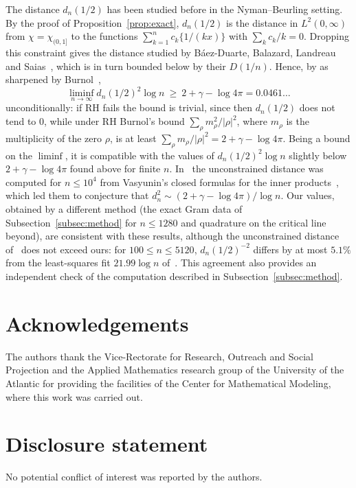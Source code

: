 \documentclass[11pt]{extarticle}
\numberwithin{equation}{section}
\theoremstyle{plain}
\theoremstyle{remark}
\begin{document}
The distance $d_n(1/2)$ has been studied before in the Nyman--Beurling setting. By
the proof of Proposition~\ref{prop:exact}, $d_n(1/2)$ is the distance in
$L^2(0,\infty)$ from $\chi = \chi_{(0,1]}$ to the functions
$\sum_{k=1}^{n} c_k \{1/(kx)\}$ with $\sum_{k} c_k/k = 0$. Dropping this constraint
gives the distance studied by B\'aez-Duarte, Balazard, Landreau and
Saias~\cite{BBLS}, which is in turn bounded below by their $D(1/n)$. Hence, by
\cite[Th\'eor\`eme]{BBLS} as sharpened by Burnol~\cite[Theorem~1.3]{burnol},
\[
\liminf_{n \to \infty} d_n(1/2)^2 \log n \ \geq\ 2 + \gamma - \log 4\pi = 0.0461\ldots
\]
unconditionally: if RH fails the bound is trivial, since then $d_n(1/2)$ does not tend
to $0$, while under RH Burnol's bound $\sum_\rho m_\rho^2/|\rho|^2$, where $m_\rho$ is
the multiplicity of the zero $\rho$, is at least
$\sum_\rho m_\rho/|\rho|^2 = 2 + \gamma - \log 4\pi$. Being a bound on the $\liminf$,
it is compatible with the values of $d_n(1/2)^2 \log n$ slightly below
$2 + \gamma - \log 4\pi$ found above for finite $n$. In~\cite[\S8]{BBLS} the unconstrained distance was computed for
$n \leq 10^4$ from Vasyunin's closed formulas for the inner
products~\cite{vasyunin}, which led them to conjecture
\cite[Conjecture~2]{BBLS} that $d_n^2 \sim (2 + \gamma - \log 4\pi)/\log n$. Our values,
obtained by a different method (the exact Gram data of Subsection~\ref{subsec:method}
for $n \leq 1280$ and quadrature on the critical line beyond), are consistent with
these results, although the unconstrained distance of~\cite{BBLS} does not exceed
ours: for $100 \leq n \leq 5120$, $d_n(1/2)^{-2}$ differs by at most
$5.1\%$ from the least-squares fit $21.99 \log n$ of~\cite[\S8]{BBLS}. This agreement also provides
an independent check of the computation described in
Subsection~\ref{subsec:method}.

\section*{Acknowledgements}
The authors thank the Vice-Rectorate for Research, Outreach and Social Projection and
the Applied Mathematics research group of the University of the Atlantic for providing
the facilities of the Center for Mathematical Modeling, where this work was carried
out.

\section*{Disclosure statement}
No potential conflict of interest was reported by the authors.
\end{document}
